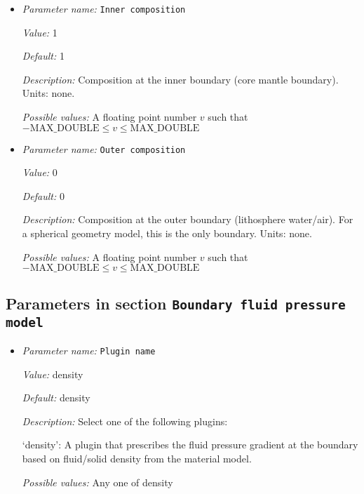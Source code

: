 \begin{itemize}
\item {\it Parameter name:} {\tt Inner composition}
\label{parameters:Boundary composition model/Spherical constant/Inner composition}


{\it Value:} 1


{\it Default:} 1


{\it Description:} Composition at the inner boundary (core mantle boundary). Units: none.


{\it Possible values:} A floating point number $v$ such that $-\text{MAX\_DOUBLE} \leq v \leq \text{MAX\_DOUBLE}$
\item {\it Parameter name:} {\tt Outer composition}
\label{parameters:Boundary composition model/Spherical constant/Outer composition}


{\it Value:} 0


{\it Default:} 0


{\it Description:} Composition at the outer boundary (lithosphere water/air). For a spherical geometry model, this is the only boundary. Units: none.


{\it Possible values:} A floating point number $v$ such that $-\text{MAX\_DOUBLE} \leq v \leq \text{MAX\_DOUBLE}$
\end{itemize}

\subsection{Parameters in section \tt Boundary fluid pressure model}
\label{parameters:Boundary_20fluid_20pressure_20model}

\begin{itemize}
\item {\it Parameter name:} {\tt Plugin name}
\label{parameters:Boundary fluid pressure model/Plugin name}


{\it Value:} density


{\it Default:} density


{\it Description:} Select one of the following plugins:

`density': A plugin that prescribes the fluid pressure gradient at the boundary based on fluid/solid density from the material model.


{\it Possible values:} Any one of density
\end{itemize}



